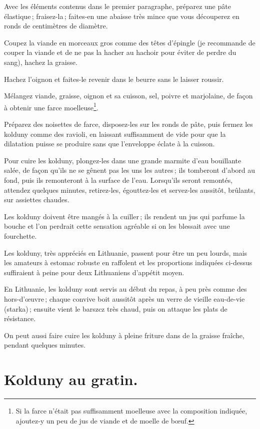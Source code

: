 Avec les éléments contenus dans le premier paragraphe, préparez une pâte
élastique ; fraisez-la ; faites-en une abaisse très mince que vous découperez
en ronds de {\mmm} centimètres de diamètre.

Coupez la viande en morceaux gros comme des têtes d'épingle (je recommande de
couper la viande et de ne pas la hacher au hachoir pour éviter de perdre du
sang), hachez la graisse.

Hachez l'oignon et faites-le revenir dans le beurre sans le laisser roussir.

Mélangez viande, graisse, oignon et sa cuisson, sel, poivre et marjolaine, de
façon à obtenir une farce moelleuse\footnote{Si la farce n'était pas
suffisamment moelleuse avec la composition indiquée, ajoutez-y un peu de jus de
viande et de moelle de bœuf.}.

Préparez des noisettes de farce, disposez-les sur les ronds de pâte, puis fermez
les kolduny comme des ravioli, en laissant suffisamment de vide pour que la
dilatation puisse se produire sans que l'enveloppe éclate à la cuisson.

Pour cuire les kolduny, plongez-les dans une grande marmite d'eau bouillante
salée, de façon qu'ils ne se gênent pas les uns les autres ; ils tomberont
d'abord au fond, puis ils remonteront à la surface de l'eau. Lorsqu'ils seront
remontés, attendez quelques minutes, retirez-les, égouttez-les et servez-les
aussitôt, brûlants, sur assiettes chaudes.

Les kolduny doivent être mangés à la cuiller ; ils rendent un jus qui parfume
la bouche et l'on perdrait cette sensation agréable si on les blessait avec une
fourchette.

Les kolduny, très appréciés en Lithuanie, passent pour être un peu lourds,
mais les amateurs à estomac robuste en raffolent et les proportions indiquées
ci-dessus suffiraient à peine pour deux Lithuaniens d'appétit moyen.

En Lithuanie, les kolduny sont servis au début du repas, à peu près comme des
hors-d'œuvre ; chaque convive boit aussitôt après un verre de vieille
eau-de-vie (starka) ; ensuite vient le barszcz très chaud, puis on attaque les
plats de résistance.

\sk

On peut aussi faire cuire les kolduny à pleine friture dans de la graisse fraîche,
pendant quelques minutes.

\section*{\centering Kolduny au gratin.}
{}

